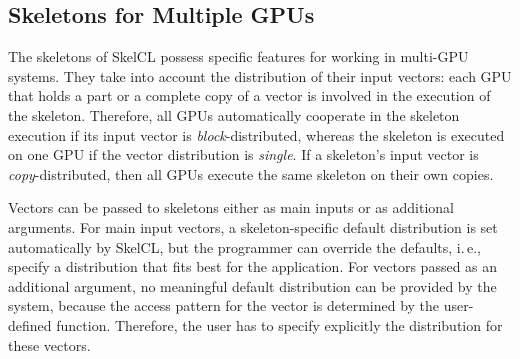 

\subsection{Skeletons for Multiple GPUs}
\label{sec:multi-gpu_skeletons}

The skeletons of SkelCL possess specific features for working in multi-GPU systems.
They take into account the distribution of their input vectors: each GPU that holds a part or a complete copy of a vector is involved in the execution of the skeleton.
Therefore, all GPUs automatically cooperate in the skeleton execution if its input vector is \emph{block}-distributed, whereas the skeleton is executed on one GPU if the vector distribution is \emph{single}.
If a skeleton's input vector is \emph{copy}-distributed, then all GPUs execute the same skeleton on their own copies.

Vectors can be passed to skeletons either as main inputs or as additional arguments.
For main input vectors, a skeleton-specific default distribution is set automatically by SkelCL, but the programmer can override the defaults, i.\,e., specify a distribution that fits best for the application.
For vectors passed as an additional argument, no meaningful default distribution can be provided by the system, because the access pattern for the vector is determined by the user-defined function.
Therefore, the user has to specify explicitly the distribution for these vectors.


